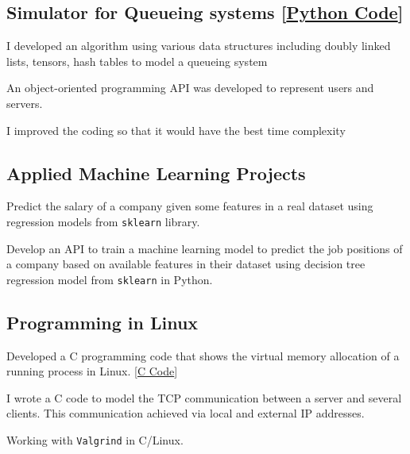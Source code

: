 \documentclass[letter,10pt]{article}
\begin{document}
	
	\subsection{Simulator for Queueing systems [\href{https://github.com/Hadi2525/queueing_theory}{Python Code}]}
	\begin{zitemize}
		\item I developed an algorithm using various data structures including doubly linked lists, tensors, hash tables to model a queueing system
		\item An object-oriented programming API was developed to represent users and servers.
		\item I improved the coding so that it would have the best time complexity 
	\end{zitemize}

	\subsection{Applied Machine Learning Projects}
	\begin{zitemize}
		\item Predict the salary of a company given some features in a real dataset using regression models from \texttt{sklearn} library.
		\item Develop an API to train a machine learning model to predict the job positions of a company based on available features in their dataset using decision tree regression model from \texttt{sklearn} in Python.
	\end{zitemize}

	\subsection{Programming in Linux }
	\begin{zitemize}
		\item Developed a C programming code that shows the virtual memory allocation of a running process in Linux. [\href{https://github.com/Hadi2525/vmemory_maps}{C Code}]
		\item I wrote a C code to model the TCP communication between a server and several clients. This communication achieved via local and external IP addresses.
		\item Working with \texttt{Valgrind} in C/Linux.
	\end{zitemize}
	
\end{document}
